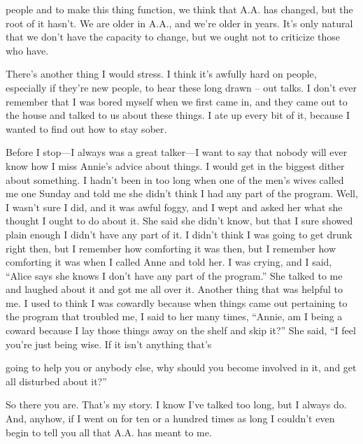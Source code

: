 people and to make this thing function, we think that A.A. has changed, but the root of it hasn’t. We are older in A.A., and we’re older in years. It’s only natural that we don’t have the capacity to change, but we ought not to criticize those who have.

There’s another thing I would stress. I think it’s awfully hard on people, especially if they’re new people, to hear these long drawn – out talks. I don’t ever remember that I was bored myself when we first came in, and they came out to the house and talked to us about these things. I ate up every bit of it, because I wanted to find out how to stay sober.

Before I stop—I always was a great talker—I want to say that nobody will ever know how I miss Annie’s advice about things. I would get in the biggest dither about something. I hadn’t been in too long when one of the men’s wives called me one Sunday and told me she didn’t think I had any part of the program. Well, I wasn’t sure I did, and it was awful foggy, and I wept and asked her what she thought I ought to do about it. She said she didn’t know, but that I sure showed plain enough I didn’t have any part of it. I didn’t think I was going to get drunk right then, but I remember how comforting it was then, but I remember how comforting it was when I called Anne and told her. I was crying, and I said, “Alice says she knows I don’t have any part of the program.” She talked to me and laughed about it and got me all over it. Another thing that was helpful to me. I used to think I was cowardly because when things came out pertaining to the program that troubled me, I said to her many times, “Annie, am I being a coward because I lay those things away on the shelf and skip it?” She said, “I feel you’re just being wise. If it isn’t anything that’s

going to help you or anybody else, why should you become involved in it, and get all disturbed about it?”

So there you are. That’s my story. I know I’ve talked too long, but I always do. And, anyhow, if I went on for ten or a hundred times as long I couldn’t even begin to tell you all that A.A. has meant to me.

